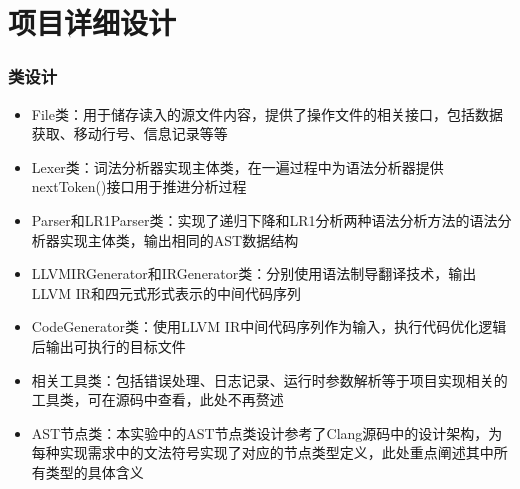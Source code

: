 \section{项目详细设计}
\begin{frame}
    \frametitle{类设计}
    \footnotesize
    \begin{itemize}
        \item {File类：用于储存读入的源文件内容，提供了操作文件的相关接口，包括数据获取、移动行号、信息记录等等}
        \item {Lexer类：词法分析器实现主体类，在一遍过程中为语法分析器提供nextToken()接口用于推进分析过程}
        \item {Parser和LR1Parser类：实现了递归下降和LR1分析两种语法分析方法的语法分析器实现主体类，输出相同的AST数据结构}
        \item {LLVMIRGenerator和IRGenerator类：分别使用语法制导翻译技术，输出LLVM IR和四元式形式表示的中间代码序列}
        \item {CodeGenerator类：使用LLVM IR中间代码序列作为输入，执行代码优化逻辑后输出可执行的目标文件}
        \item {相关工具类：包括错误处理、日志记录、运行时参数解析等于项目实现相关的工具类，可在源码中查看，此处不再赘述}
        \item {AST节点类：本实验中的AST节点类设计参考了Clang源码中的设计架构，为每种实现需求中的文法符号实现了对应的节点类型定义，此处重点阐述其中所有类型的具体含义}
    \end{itemize}
\end{frame}
